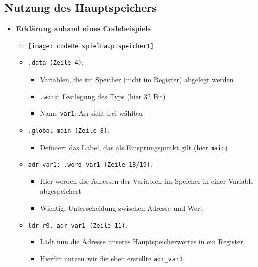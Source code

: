 \subsection{Nutzung des Hauptspeichers}
    \begin{itemize}
        \item \textbf{Erklärung anhand eines Codebeispiels}
            \begin{itemize}
                \item[] \texttt{[image: codeBeispielHauptspeicher1]}
                \item \texttt{.data (Zeile 4)}: 
                    \begin{itemize}
                        \item Variablen, die im Speicher (nicht im Register) abgelegt werden
                        \item \texttt{.word}: Festlegung des Typs (hier 32 Bit)
                        \item Name \texttt{var1}: An sicht frei wählbar
                    \end{itemize}

                \item \texttt{.global main (Zeile 8)}:
                    \begin{itemize}
                        \item Definiert das Label, das als Einsprungspunkt gilt (hier \texttt{main})
                    \end{itemize}

                \item \texttt{adr\_var1: .word var1 (Zeile 18/19)}:
                    \begin{itemize}
                        \item Hier werden die Adressen der Variablen im Speicher in einer Variable abgespeichert
                        \item Wichtig: Unterscheidung zwischen Adresse und Wert
                    \end{itemize}

                \item \texttt{ldr r0, adr\_var1 (Zeile 11)}:
                    \begin{itemize}
                        \item Lädt nun die Adresse unseres Hauptspeicherwertes in ein Register
                        \item Hierfür nutzen wir die eben erstellte \texttt{adr\_var1}
                    \end{itemize}


\end{itemize}
\end{itemize}
